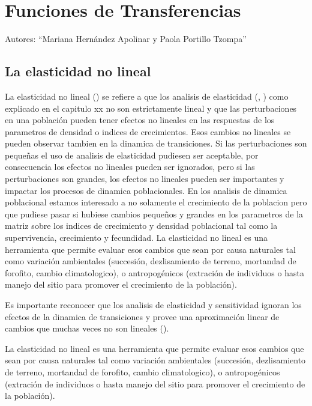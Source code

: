 \documentclass[
]{book}
\theoremstyle{definition}
\theoremstyle{definition}
\theoremstyle{definition}
\theoremstyle{definition}
\theoremstyle{remark}
\begin{document}
\chapter{Funciones de Transferencias}\label{funciones-de-transferencias}

Autores: ``Mariana Hernández Apolinar y Paola Portillo Tzompa''

\section{La elasticidad no lineal}\label{la-elasticidad-no-lineal}

La elasticidad no lineal (\citet{hodgson2004methodological}) se refiere a que los analisis de elasticidad (\citet{caswell2000matrix}, \citet{de2000elasticities}) como explicado en el capitulo xx no son estrictamente lineal y que las perturbaciones en una población pueden tener efectos no lineales en las respuestas de los parametros de densidad o indices de crecimientos. Esos cambios no lineales se pueden observar tambien en la dinamica de transiciones. Si las perturbaciones son pequeñas el uso de analisis de elasticidad pudiesen ser aceptable, por consecuencia los efectos no lineales pueden ser ignorados, pero si las perturbaciones son grandes, los efectos no lineales pueden ser importantes y impactar los procesos de dinamica poblacionales. En los analisis de dinamica poblacional estamos interesado a no solamente el crecimiento de la poblacion pero que pudiese pasar si hubiese cambios pequeños y grandes en los parametros de la matriz sobre los indices de crecimiento y densidad poblacional tal como la supervivencia, crecimiento y fecundidad. La elasticidad no lineal es una herramienta que permite evaluar esos cambios que sean por causa naturales tal como variación ambientales (succesión, dezlisamiento de terreno, mortandad de forofito, cambio climatologico), o antropogénicos (extración de individuos o hasta manejo del sitio para promover el crecimiento de la población).

Es importante reconocer que los analisis de elasticidad y sensitividad ignoran los efectos de la dinamica de transiciones y provee una aproximación linear de cambios que muchas veces no son lineales (\citet{stott2012beyond}).

La elasticidad no lineal es una herramienta que permite evaluar esos cambios que sean por causa naturales tal como variación ambientales (succesión, dezlisamiento de terreno, mortandad de forofito, cambio climatologico), o antropogénicos (extración de individuos o hasta manejo del sitio para promover el crecimiento de la población).
\end{document}
